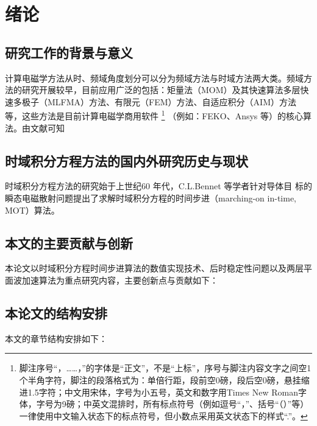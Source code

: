 
\chapter{绪\hspace{6pt}论}


\section{研究工作的背景与意义}

计算电磁学方法从时、频域角度划分可以分为频域方法与时域方法两大类。频域方法的研究开展较早，目前应用广泛的包括：矩量法（MOM）及其快速算法多层快速多极子（MLFMA）方法、有限元（FEM）方法、自适应积分（AIM）方法等，这些方法是目前计算电磁学商用软件
\footnote{脚注序号“，……，”的字体是“正文”，不是“上标”，序号与脚注内容文字之间空1个半角字符，脚注的段落格式为：单倍行距，段前空0磅，段后空0磅，悬挂缩进1.5字符；中文用宋体，字号为小五号，英文和数字用Times New Roman字体，字号为9磅；中英文混排时，所有标点符号（例如逗号“，”、括号“（）”等）一律使用中文输入状态下的标点符号，但小数点采用英文状态下的样式“.”。}
（例如：FEKO、Ansys 等）的核心算法。由文献\cite{feng997he,clerc2010discrete,xiao2012yi}可知

\section{时域积分方程方法的国内外研究历史与现状}
时域积分方程方法的研究始于上世纪60 年代，C.L.Bennet 等学者针对导体目
标的瞬态电磁散射问题提出了求解时域积分方程的时间步进（marching-on in-time,
MOT）算法。

\section{本文的主要贡献与创新}
本论文以时域积分方程时间步进算法的数值实现技术、后时稳定性问题以及两层平面波加速算法为重点研究内容，主要创新点与贡献如下：

\section{本论文的结构安排}
本文的章节结构安排如下：
